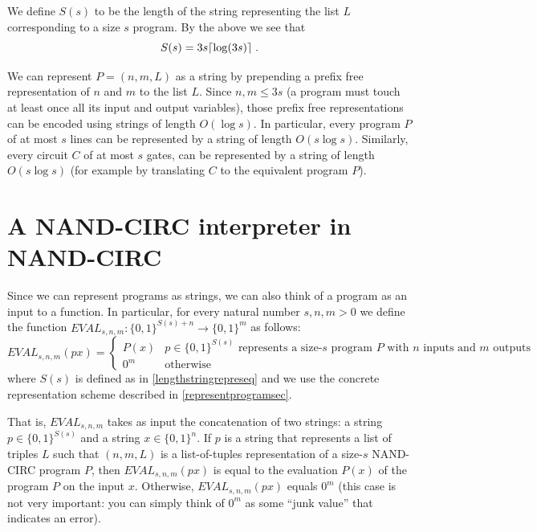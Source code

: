 We define \(S(s)\) to be the length of the string representing the list
\(L\) corresponding to a size \(s\) program. By the above we see that \[
S(s) = 3s\ceil{\log (3s)} \;. \label{lengthstringrepreseq}
\]

We can represent \(P=(n,m,L)\) as a string by prepending a prefix free
representation of \(n\) and \(m\) to the list \(L\). Since
\(n,m \leq 3s\) (a program must touch at least once all its input and
output variables), those prefix free representations can be encoded
using strings of length \(O(\log s)\). In particular, every program
\(P\) of at most \(s\) lines can be represented by a string of length
\(O(s\log s)\). Similarly, every circuit \(C\) of at most \(s\) gates,
can be represented by a string of length \(O(s \log s)\) (for example by
translating \(C\) to the equivalent program \(P\)).

\section{A NAND-CIRC interpreter in
NAND-CIRC}\label{A-NAND-CIRC-interpreter-i}

Since we can represent programs as strings, we can also think of a
program as an input to a function. In particular, for every natural
number \(s,n,m>0\) we define the function
\(\ensuremath{\mathit{EVAL}}_{s,n,m}:\{0,1\}^{S(s)+n} \rightarrow \{0,1\}^m\)
as follows: \[
\ensuremath{\mathit{EVAL}}_{s,n,m}(px) = \begin{cases} P(x) & \text{$p\in \{0,1\}^{S(s)}$ represents a size-$s$ program $P$ with $n$ inputs and $m$ outputs}  \\ 0^m & \text{otherwise} \end{cases} \label{evalcirceq}
\] where \(S(s)\) is defined as in \eqref{lengthstringrepreseq} and we
use the concrete representation scheme described in
\cref{representprogramsec}.

That is, \(\ensuremath{\mathit{EVAL}}_{s,n,m}\) takes as input the
concatenation of two strings: a string \(p\in \{0,1\}^{S(s)}\) and a
string \(x\in \{0,1\}^n\). If \(p\) is a string that represents a list
of triples \(L\) such that \((n,m,L)\) is a list-of-tuples
representation of a size-\(s\) NAND-CIRC program \(P\), then
\(\ensuremath{\mathit{EVAL}}_{s,n,m}(px)\) is equal to the evaluation
\(P(x)\) of the program \(P\) on the input \(x\). Otherwise,
\(\ensuremath{\mathit{EVAL}}_{s,n,m}(px)\) equals \(0^m\) (this case is
not very important: you can simply think of \(0^m\) as some ``junk
value'' that indicates an error).

